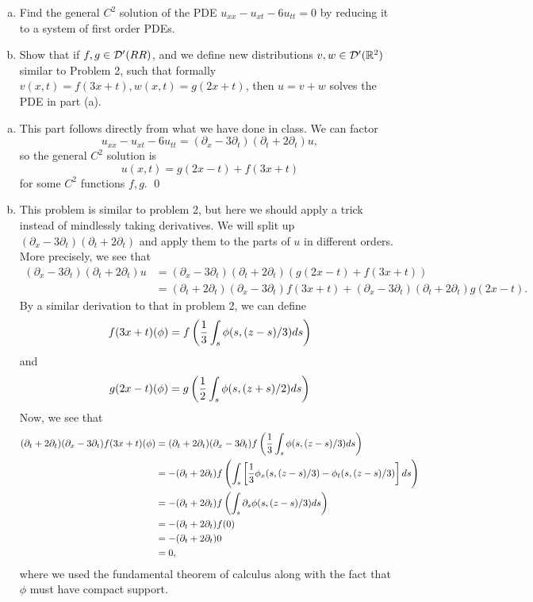 \documentclass{article}
\renewcommand{\d}{\partial}
\begin{document}
\newpage
{} \begin{enumerate}[(a)]
    \item Find the general $C^2$ solution of the PDE $u_{xx} - u_{xt} - 6u_{tt} = 0$ by reducing it to a
    system of first order PDEs.
    \item Show that if $f,g \in \cal{D}'(RR)$, and we define new distributions $v,w \in \cal{D}'(\RR^2)$ similar to Problem 2,
    such that formally $v(x,t) = f(3x+ t), w(x,t) = g(2x+ t)$, then $u = v + w$ solves the PDE in part (a).
\end{enumerate}
 \tri
\hop
\solution
\begin{enumerate}[(a)]
    \item This part follows directly from what we have done in class. We can factor 
    \[u_{xx}-u_{xt}-6u_{tt} = (\d_x - 3\d_t)(\d_t + 2\d_t)u,\]
    so the general $C^2$ solution is 
    \[u(x,t) = g(2x-t) + f(3x + t)\]
    for some $C^2$ functions $f,g$. \qed
    \item This problem is similar to problem 2, but here we should apply a trick instead of mindlessly taking derivatives. We will split up $ (\d_x - 3\d_t)(\d_t + 2\d_t)$ and apply them to the parts of $u$ in different orders. More precisely, we see that 
    \begin{align*}
        (\d_x - 3\d_t)(\d_t + 2\d_t)u &= (\d_x - 3\d_t)(\d_t + 2\d_t)( g(2x-t) + f(3x + t)) \\ 
        &= (\d_t + 2\d_t)(\d_x - 3\d_t)f(3x + t) +  (\d_x - 3\d_t)(\d_t + 2\d_t)g(2x-t).
    \end{align*}
    By a similar derivation to that in problem 2, we can define 
    \[f(3x+t)(\phi) = f\del{\frac{1}{3}\int_s \phi(s, (z-s)/3)ds}\]
    and 
    \[g(2x-t)(\phi) = g\del{\frac{1}{2}\int_s \phi(s, (z+s)/2)ds}\]
    Now, we see that 
    \begin{align*}
        (\d_t + 2\d_t)(\d_x - 3\d_t)f(3x + t)(\phi) &= (\d_t + 2\d_t)(\d_x - 3\d_t)f\del{\frac{1}{3}\int_s \phi(s, (z-s)/3)ds} \\
        &=-(\d_t + 2\d_t)f\del{\int_s \sbr{\frac{1}{3}\phi_x(s, (z-s)/3) - \phi_t(s, (z-s)/3)}ds}\\
        &= -(\d_t + 2\d_t)f\del{\int_s \d_s \phi(s, (z-s)/3)ds} \\
        &= -(\d_t + 2\d_t)f(0)\\
        &= -(\d_t + 2\d_t)0\\
        &=0,
    \end{align*}
    where we used the fundamental theorem of calculus along with the fact that $\phi$ must have compact support. 

\end{enumerate}
\end{document}
